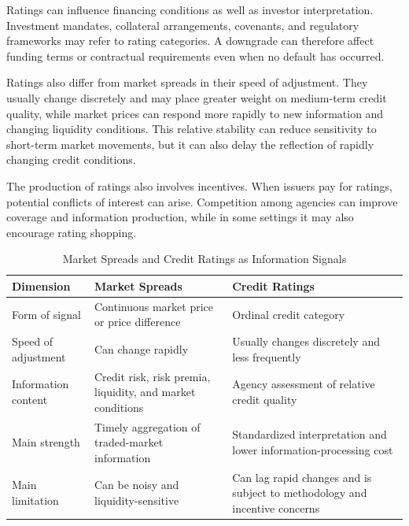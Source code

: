 Ratings can influence financing conditions as well as investor interpretation. Investment mandates, collateral arrangements, covenants, and regulatory frameworks may refer to rating categories. A downgrade can therefore affect funding terms or contractual requirements even when no default has occurred.

Ratings also differ from market spreads in their speed of adjustment. They usually change discretely and may place greater weight on medium-term credit quality, while market prices can respond more rapidly to new information and changing liquidity conditions. This relative stability can reduce sensitivity to short-term market movements, but it can also delay the reflection of rapidly changing credit conditions.

The production of ratings also involves incentives. When issuers pay for ratings, potential conflicts of interest can arise. Competition among agencies can improve coverage and information production, while in some settings it may also encourage rating shopping.

\begin{table}[H]

\centering

\caption{Market Spreads and Credit Ratings as Information Signals}

\label{tab:ch19-spreads-ratings}

\begin{tabularx}{\textwidth}{@{}p{3.3cm}YY@{}}

\toprule

\textbf{Dimension} &
\textbf{Market Spreads} &
\textbf{Credit Ratings} \\

\midrule

Form of signal &
Continuous market price or price difference &
Ordinal credit category \\

Speed of adjustment &
Can change rapidly &
Usually changes discretely and less frequently \\

Information content &
Credit risk, risk premia, liquidity, and market conditions &
Agency assessment of relative credit quality \\

Main strength &
Timely aggregation of traded-market information &
Standardized interpretation and lower information-processing cost \\

Main limitation &
Can be noisy and liquidity-sensitive &
Can lag rapid changes and is subject to methodology and incentive concerns \\

\bottomrule

\end{tabularx}

\end{table}

